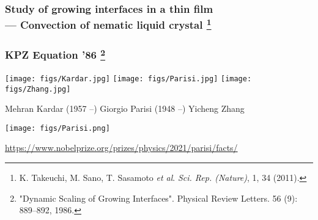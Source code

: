 \documentclass[9pt,xcolor=dvipsnames,table]{beamer}
\begin{document}
\begin{frame}[fragile] %
  \frametitle{Study of growing interfaces in a thin film \\
    \small --- Convection of nematic liquid crystal \footnote{
      \textcolor{refcolor}{K. Takeuchi, M. Sano, T. Sasamoto {\it et al}}. {\it Sci. Rep. (Nature)}, 1, 34 (2011).
  }}

  \begin{center}
  \end{center}

\end{frame}
\begin{frame}[fragile] %
  \frametitle{KPZ Equation '86 \footnote{"Dynamic Scaling of Growing Interfaces". Physical Review
  Letters. 56 (9): 889--892, 1986.}}

  \begin{center}
    \texttt{[image: figs/Kardar.jpg]}
    \texttt{[image: figs/Parisi.jpg]}
    \texttt{[image: figs/Zhang.jpg]}
  \end{center}

  \small
  \quad Mehran Kardar (1957 --) \:\:  Giorgio Parisi (1948 --) \qquad\qquad Yicheng Zhang
\end{frame}
\begin{frame}[fragile] %
 \begin{center}
  \texttt{[image: figs/Parisi.png]}
  \bigskip

  \small
  \url{https://www.nobelprize.org/prizes/physics/2021/parisi/facts/}
 \end{center}
\end{frame}
\end{document}
